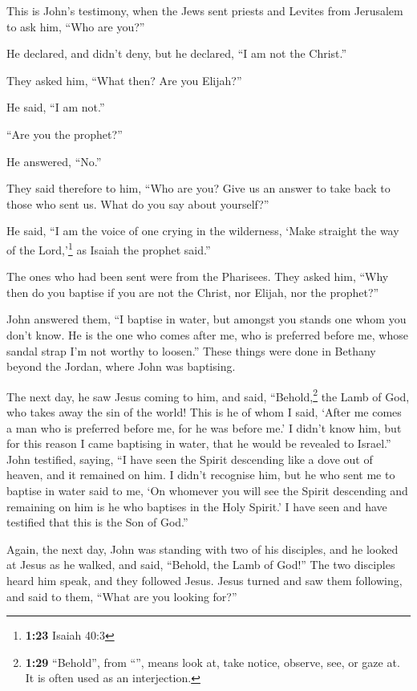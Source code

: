 This is John's testimony, when the Jews sent priests and
Levites from Jerusalem to ask him, ``Who are you?''

 He declared, and didn't deny, but he declared, ``I am
not the Christ.''

 They asked him, ``What then? Are you Elijah?''

He said, ``I am not.''

``Are you the prophet?''

He answered, ``No.''

 They said therefore to him, ``Who are you? Give us an
answer to take back to those who sent us. What do you say about
yourself?''

 He said, ``I am the voice of one crying in the
wilderness, `Make straight the way of the Lord,'\footnote{\textbf{1:23}
  Isaiah 40:3} as Isaiah the prophet said.''

 The ones who had been sent were from the Pharisees.
 They asked him, ``Why then do you baptise if you are not
the Christ, nor Elijah, nor the prophet?''

 John answered them, ``I baptise in water, but amongst
you stands one whom you don't know.  He is the one who
comes after me, who is preferred before me, whose sandal strap I'm not
worthy to loosen.''  These things were done in Bethany
beyond the Jordan, where John was baptising.

 The next day, he saw Jesus coming to him, and said,
``Behold,\footnote{\textbf{1:29} ``Behold'', from ``'',
  means look at, take notice, observe, see, or gaze at. It is often used
  as an interjection.} the Lamb of God, who takes away the sin of the
world!  This is he of whom I said, `After me comes a man
who is preferred before me, for he was before me.'  I
didn't know him, but for this reason I came baptising in water, that he
would be revealed to Israel.''  John testified, saying,
``I have seen the Spirit descending like a dove out of heaven, and it
remained on him.  I didn't recognise him, but he who sent
me to baptise in water said to me, `On whomever you will see the Spirit
descending and remaining on him is he who baptises in the Holy Spirit.'
 I have seen and have testified that this is the Son of
God.''

 Again, the next day, John was standing with two of his
disciples,  and he looked at Jesus as he walked, and
said, ``Behold, the Lamb of God!''  The two disciples
heard him speak, and they followed Jesus.  Jesus turned
and saw them following, and said to them, ``What are you looking for?''

